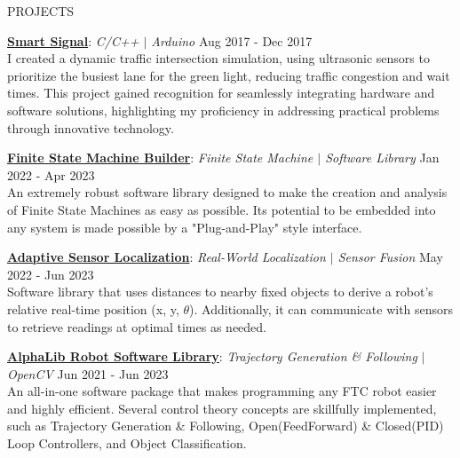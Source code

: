 \documentclass{resume} %
\begin{document}
\begin{rSection}{PROJECTS}
\vspace{-1.25em}
\item{\underline{\textbf{Smart Signal}}}: \textit{C/C++ $\vert$ Arduino} \hfill {Aug 2017 - Dec 2017} \vspace{0.25em} \\
{I created a dynamic traffic intersection simulation, using ultrasonic sensors to prioritize the busiest lane for the green light, reducing traffic congestion and wait times. This project gained recognition for seamlessly integrating hardware and software solutions, highlighting my proficiency in addressing practical problems through innovative technology.}

\item{\underline{\textbf{Finite State Machine Builder}}}: \textit{Finite State Machine $\vert$ Software Library} \hfill {Jan 2022 - Apr 2023} \vspace{0.25em} \\
{An extremely robust software library designed to make the creation and analysis of Finite State Machines as easy as possible. Its potential to be embedded into any system is made possible by a "Plug-and-Play" style interface.}

\item{\underline{\textbf{Adaptive Sensor Localization}}}: \textit{Real-World Localization $\vert$ Sensor Fusion} \hfill {May 2022 - Jun 2023} \vspace{0.25em}\\
{Software library that uses distances to nearby fixed objects to derive a robot's relative real-time position (x, y, $\theta$). Additionally, it can communicate with sensors to retrieve readings at optimal times as needed.}

\item{\underline{\textbf{AlphaLib Robot Software Library}}}: \textit{Trajectory Generation \& Following $\vert$ OpenCV} \hfill {Jun 2021 - Jun 2023} \vspace{0.25em}\\
{An all-in-one software package that makes programming any FTC robot easier and highly efficient. Several control theory concepts are skillfully implemented, such as Trajectory Generation \& Following, Open(FeedForward) \& Closed(PID) Loop Controllers, and Object Classification.}
\end{rSection} 
\end{document}
